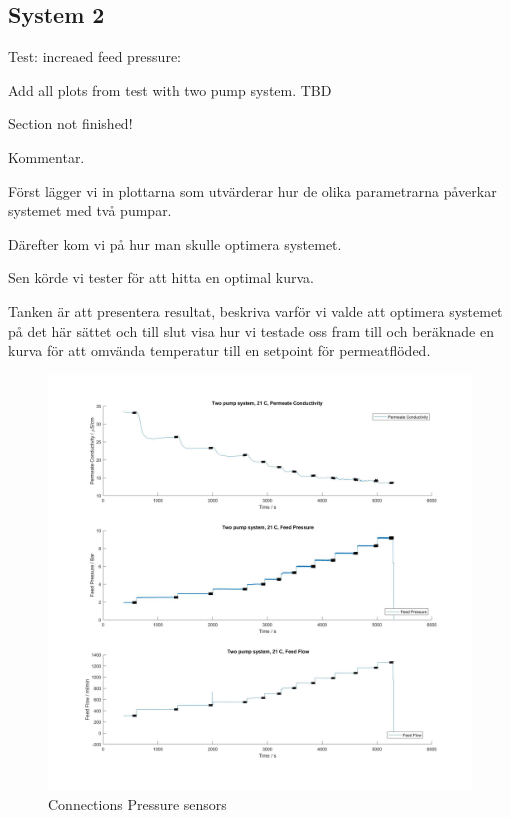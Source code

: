 \subsection{System 2}

Test: increaed feed pressure:

Add all plots from test with two pump system. TBD 

Section not finished! 

Kommentar. 

Först lägger vi in plottarna som utvärderar hur de olika parametrarna påverkar systemet med två pumpar.

Därefter kom vi på hur man skulle optimera systemet.

Sen körde vi tester för att hitta en optimal kurva.

Tanken är att presentera resultat, beskriva varför vi valde att optimera systemet på det här sättet och till slut visa hur vi testade oss fram till och beräknade en kurva för att omvända temperatur till en setpoint för permeatflöded.

\begin{figure}[H]
    \centering
    \includegraphics[width=1.1\textwidth]{FeedPumpIncrease21}
    \caption{Connections Pressure sensors}
    \label{fig:PressConn}
\end{figure}



